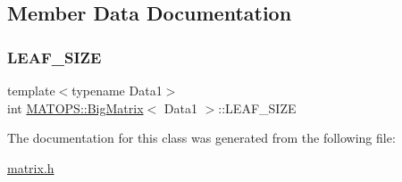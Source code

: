 \subsection{Member Data Documentation}
\mbox{\label{classMATOPS_1_1BigMatrix_a3e8820058e3950e17136fd656b97de54}} 
\subsubsection{\texorpdfstring{L\+E\+A\+F\+\_\+\+S\+I\+ZE}{LEAF\_SIZE}}
{\footnotesize\ttfamily template$<$typename Data1$>$ \\
int \hyperlink{classMATOPS_1_1BigMatrix}{M\+A\+T\+O\+P\+S\+::\+Big\+Matrix}$<$ Data1 $>$\+::L\+E\+A\+F\+\_\+\+S\+I\+ZE\hspace{0.3cm}{\ttfamily [private]}}



The documentation for this class was generated from the following file\+:\begin{DoxyCompactItemize}
\item 
\hyperlink{matrix_8h}{matrix.\+h}\end{DoxyCompactItemize}
